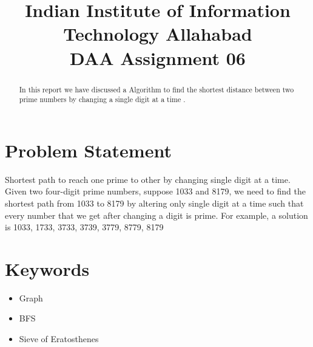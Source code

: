 \documentclass[conference]{IEEEtran}
\begin{document}
\title{Indian Institute of Information Technology  Allahabad \\
DAA Assignment 06\\
}

\author{
\and
{}
\and
{}
}

\maketitle

\begin{abstract}
In this report we have discussed a Algorithm to find the shortest distance between two prime numbers by changing a single digit at a time .

\end{abstract}
\section{Problem Statement}
Shortest path to reach one prime to other by changing single digit at a time. Given two four-digit prime numbers, suppose 1033 and 8179, we need to find the shortest path from 1033 to 8179 by altering only single digit at a time such that every number that we get after changing a digit is prime. For example, a solution is 1033, 1733, 3733, 3739, 3779, 8779, 8179
\section{Keywords}
\begin{itemize}
    \item Graph
    \item BFS
    \item Sieve of Eratosthenes
\end{itemize}
\end{document}
